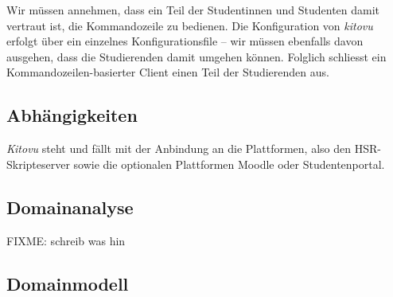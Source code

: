 \documentclass[a4paper]{article}
\let\oldsection\section
\renewcommand\section{\clearpage\oldsection}
\begin{document}
Wir müssen annehmen, dass ein Teil der Studentinnen und Studenten damit vertraut ist, die Kommandozeile zu bedienen. Die Konfiguration von \emph{kitovu} erfolgt über ein einzelnes Konfigurationsfile -- wir müssen ebenfalls davon ausgehen, dass die Studierenden damit umgehen können. Folglich schliesst ein Kommandozeilen-basierter Client einen Teil der Studierenden aus.

\subsection{Abhängigkeiten}
\emph{Kitovu} steht und fällt mit der Anbindung an die Plattformen, also den HSR-Skripteserver sowie die optionalen Plattformen Moodle oder Studentenportal.


\pagebreak
\begin{landscape}
  \thispagestyle{empty}
  \section{Domainanalyse}
  
  FIXME: schreib was hin
  
  \subsection{Domainmodell}
  
\end{landscape}
\end{document}
